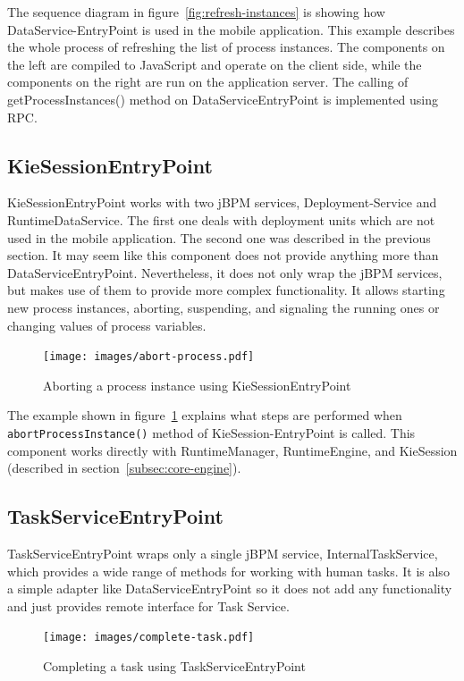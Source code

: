 \documentclass[12pt,oneside,final]{fithesis2}
\begin{document}
The sequence diagram in figure~\ref{fig:refresh-instances} is showing how DataService-EntryPoint is used in the mobile application.
This example describes the whole process of refreshing the list of process instances.
The components on the left are compiled to JavaScript and operate on the client side, while the components on the right are run on the application server.
The calling of getProcessInstances() method on DataServiceEntryPoint is implemented using RPC.

\subsection{KieSessionEntryPoint}

KieSessionEntryPoint works with two jBPM services, Deployment-Service and RuntimeDataService.
The first one deals with deployment units which are not used in the mobile application.
The second one was described in the previous section.
It may seem like this component does not provide anything more than DataServiceEntryPoint.
Nevertheless, it does not only wrap the jBPM services, but makes use of them to provide more complex functionality.
It allows starting new process instances, aborting, suspending, and signaling the running ones or changing values of process variables.

\begin{figure}[ht!]
\centering
\texttt{[image: images/abort-process.pdf]}
\caption{Aborting a process instance using KieSessionEntryPoint}
\label{fig:abort-process}
\end{figure}

The example shown in figure~\ref{fig:abort-process} explains what steps are performed when \verb|abortProcessInstance()| method of KieSession-EntryPoint is called.
This component works directly with RuntimeManager, RuntimeEngine, and KieSession (described in section~\ref{subsec:core-engine}).

\subsection{TaskServiceEntryPoint}

TaskServiceEntryPoint wraps only a single jBPM service, InternalTaskService, which provides a wide range of methods for working with human tasks.
It is also a simple adapter like DataServiceEntryPoint so it does not add any functionality and just provides remote interface for Task Service.

\begin{figure}[ht!]
\centering
\texttt{[image: images/complete-task.pdf]}
\caption{Completing a task using TaskServiceEntryPoint}
\label{fig:complete-task}
\end{figure}
\end{document}
